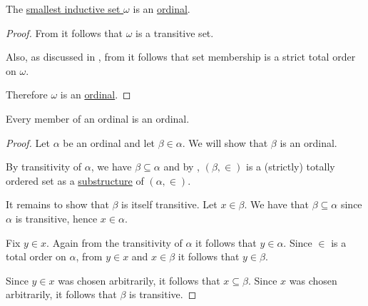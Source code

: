 \begin{proposition}\label{thm:omega_is_an_ordinal}
  The \hyperref[thm:smallest_inductive_set_existence_existence]{smallest inductive set \( \omega \)} is an \hyperref[def:ordinal]{ordinal}.
\end{proposition}
\begin{proof}
  From  it follows that \( \omega \) is a transitive set.

  Also, as discussed in , from  it follows that set membership is a strict total order on \( \omega \).

  Therefore \( \omega \) is an \hyperref[def:ordinal]{ordinal}.
\end{proof}

\begin{proposition}\label{thm:member_of_ordinal_is_ordinal}
  Every member of an ordinal is an ordinal.
\end{proposition}
\begin{proof}
  Let \( \alpha \) be an ordinal and let \( \beta \in \alpha \). We will show that \( \beta \) is an ordinal.

  By transitivity of \( \alpha \), we have \( \beta \subseteq \alpha \) and by , \( (\beta, \in) \) is a (strictly) totally ordered set as a \hyperref[def:first_order_substructure]{substructure} of \( (\alpha, \in) \).

  It remains to show that \( \beta \) is itself transitive. Let \( x \in \beta \). We have that \( \beta \subseteq \alpha \) since \( \alpha \) is transitive, hence \( x \in \alpha \).

  Fix \( y \in x \). Again from the transitivity of \( \alpha \) it follows that \( y \in \alpha \). Since \( \in \) is a total order on \( \alpha \), from \( y \in x \) and \( x \in \beta \) it follows that \( y \in \beta \).

  Since \( y \in x \) was chosen arbitrarily, it follows that \( x \subseteq \beta \). Since \( x \) was chosen arbitrarily, it follows that \( \beta \) is transitive.
\end{proof}

